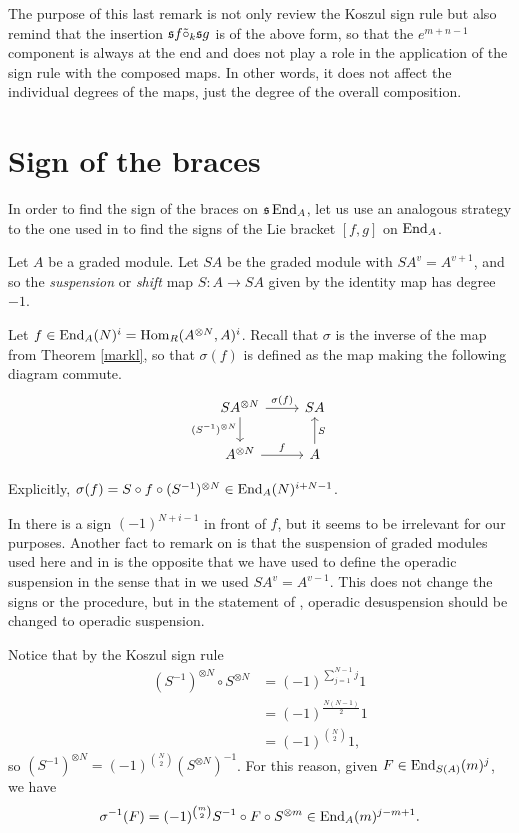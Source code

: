 \documentclass[Thesis.tex]{subfiles}
\begin{document}
The purpose of this last remark is not only review the Koszul sign rule but also remind that the insertion $\mathfrak{s} f\tilde{\circ}_{k} \mathfrak{s} g$ is of the above form, so that the $e^{m+n-1}$ component is always at the end and does not play a role in the application of the sign rule with the composed maps. In other words, it does not affect the individual degrees of the maps, just the degree of the overall composition. %

\section{Sign of the braces}\label{rw}



In order to find the sign of the braces on $\mathfrak{s}\operatorname{End}_A$, let us use an analogous strategy to the one used in \cite[Appendix]{RW} to find the signs of the Lie bracket $[f,g]$ on $\operatorname{End}_A$.

Let $A$ be a graded module. Let $SA$ be the graded module with $SA^v=A^{v+1}$, and so the \emph{suspension} or \emph{shift} map $S:A\to SA$ given by the identity map has degree $-1$.

 Let $f\in \operatorname{End}_A(N)^i=\operatorname{Hom}_R(A^{\otimes N},A)^i$. Recall that $\sigma$ is the inverse of the map from Theorem \ref{markl}, so that $\sigma(f)$ is defined as the map making the following diagram commute.
\[
\begin{tikzcd}
SA^{\otimes N}\arrow[r, "\sigma(f)"]\arrow[d, "(S^{-1})^{\otimes N}"'] & SA\\
A^{\otimes N}\arrow[r,"f"] & A\arrow[u, "S"']
\end{tikzcd}
\]

Explicitly, $\sigma(f)=S\circ f\circ (S^{-1})^{\otimes N}\in \operatorname{End}_A(N)^{i+N-1}$. 

\begin{remark}
In \cite{RW} there is a sign $(-1)^{N+i-1}$ in front of $f$, but it seems to be irrelevant for our purposes. Another fact to remark on is that the suspension of graded modules used here and in \cite{RW} is the opposite that we have used to define the operadic suspension in the sense that in  we used $SA^v=A^{v-1}$. This does not change the signs or the procedure, but in the statement of , operadic desuspension should be changed to operadic suspension. %
\end{remark}


Notice that by the Koszul sign rule 
\begin{align*}
(S^{-1})^{\otimes N}\circ S^{\otimes N}&=(-1)^{\sum_{j=1}^{N-1} j}1\\
&=(-1)^{\frac{N(N-1)}{2}}1\\
&=(-1)^{\binom{N}{2}}1,
\end{align*}
so $(S^{-1})^{\otimes N}= (-1)^{\binom{N}{2}}(S^{\otimes N})^{-1}$. For this reason, given $F\in \operatorname{End}_{S(A)}(m)^j$, we have
\[
\sigma^{-1}(F)=(-1)^{\binom{m}{2}}S^{-1}\circ F\circ S^{\otimes m}\in \operatorname{End}_A(m)^{j-m+1}.
\]
\end{document}
